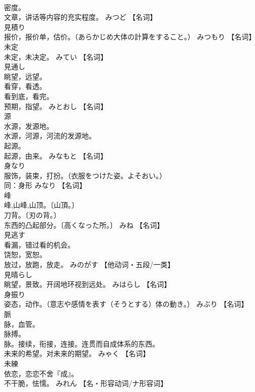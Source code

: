 \documentclass[8pt]{extreport}
\begin{document}
\begin{CJK}{UTF8}{min}
\\	密度。 
\\	文章，讲话等内容的充实程度。	みつど		【名词】
\\	見積り	
\\	报价，报价单，估价。（あらかじめ大体の計算をすること。）	みつもり		【名词】
\\	未定	
\\	未定，未决定。	みてい		【名词】
\\	見通し	
\\	眺望，远望。 
\\	看穿，看透。 
\\	看到底，看完。 
\\	预期，指望。	みとおし		【名词】
\\	源	
\\	水源，发源地。 
\\	水源，河源，河流的发源地。 
\\	起源。 
\\	起源，由来。	みなもと		【名词】
\\	身なり	
\\	服饰，装束，打扮。（衣服をつけた姿。よそおい。） 
\\	同：身形	みなり		【名词】
\\	峰	
\\	峰,山峰,山顶。〔山頂。〕 
\\	刀背。〔刃の背。〕 
\\	东西的凸起部分。〔高くなった所。〕	みね		【名词】
\\	見逃す	
\\	看漏，错过看的机会。 
\\	饶恕，宽恕。 
\\	放过，放跑，放走。	みのがす		【他动词・五段/一类】
\\	見晴らし	
\\	眺望，景致。开阔地环视到远处。	みはらし		【名词】
\\	身振り	
\\	姿态，动作。（意志や感情を表す（そうとする）体の動き。）	みぶり		【名词】
\\	脈	
\\	脉，血管。 
\\	脉搏。 
\\	脉。接续，衔接，连接。连贯而自成体系的东西。 
\\	未来的希望。对未来的期望。	みゃく		【名词】
\\	未練	
\\	依恋，恋恋不舍『成』。 
\\	不干脆，怯懦。	みれん		【名・形容动词/ナ形容词】

\end{CJK}
\end{document}
